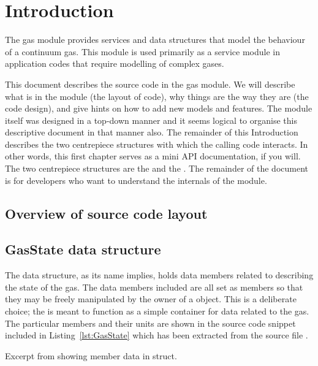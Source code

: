 \chapter{Introduction}
\label{chap:intro}

The \dlang gas module provides services and data structures that model
the behaviour of a continuum gas.
This module is used primarily as a service module in application codes that require
modelling of complex gases.

This document describes the source code in the gas module.
We will describe what is in the module (the layout of code),
why things are the way they are (the code design), 
and give hints on how to add new models and features.
The module itself was designed in a top-down manner and
it seems logical to organise this descriptive document
in that manner also.
The remainder of this Introduction describes the two
centrepiece structures with which the calling code interacts.
In other words, this first chapter serves as a mini API documentation,
if you will.
The two centrepiece structures are the   
and the .
The remainder of the document is for developers who want
to understand the internals of the module.

\section{Overview of source code layout}

\section{GasState data structure}
\label{sec:GasState}

The  data structure, as its name implies,
holds data members related to describing the state of the gas.
The data members included  are all set as 
members so that they may be freely manipulated by the owner of a 
 object. This is a deliberate choice; the 
is meant to function as a simple container for data related to the
gas.
The particular members and their units are shown in the source code
snippet included in Listing~\ref{lst:GasState} which has been extracted
from the source file .

\begin{Listing}

\caption{Excerpt from  showing member data in  struct.}
\label{lst:GasState}
\end{Listing}

